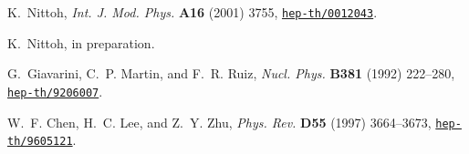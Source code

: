 \documentclass[a4paper,12pt]{article}
\begin{document}
\begin{thebibliography}{1}
K.~Nittoh,
{\em Int. J. Mod. Phys.} {\bf A16} (2001) 3755,
\href{http://www.arXiv.org/abs/hep-th/0012043}{{\tt hep-th/0012043}}.

K.~Nittoh, in preparation.

G.~Giavarini, C.~P. Martin, and F.~R. Ruiz, 
{\em Nucl. Phys.} {\bf B381} (1992) 222--280,
\href{http://www.arXiv.org/abs/hep-th/9206007}{{\tt hep-th/9206007}}.

W.~F. Chen, H.~C. Lee, and Z.~Y. Zhu, 
{\em Phys. Rev.} {\bf D55} (1997) 3664--3673,
\href{http://www.arXiv.org/abs/hep-th/9605121}{{\tt hep-th/9605121}}.

\end{thebibliography}\endgroup
\end{document}
